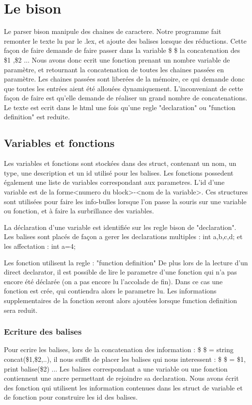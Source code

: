\documentclass{report}
\begin{document}
		\section{Le bison}{
		 Le parser bison manipule des chaines de caractere. Notre programme fait remonter le texte lu par le .lex, et ajoute des balises lorsque des réductions. Cette façon de faire demande de 
		 faire passer dans la variable \$ \$ la concatenation des \$1 ,\$2 ... Nous avons donc ecrit une fonction prenant un nombre variable de paramètre, et retournant la concatenation de toutes
		 les chaines passées en paramètre. Les chaines passées sont liberées de la mémoire, ce qui demande donc que toutes les entrées aient été allouées dynamiquement.
		 L'inconveniant de cette façon de faire est qu'elle demande de réaliser un grand nombre de concatenations.
		 Le texte est ecrit dans le html une fois qu'une regle "declaration" ou "function definition" est reduite.
			\subsection{Variables et fonctions}{
			Les variables et fonctions sont stockées dans des struct, contenant un nom, un type, une description et un id utilisé pour les balises. Les fonctions possedent également une liste 
			de variables correspondant aux parametres. L'id d'une variable est de la forme<numero du block>-<nom de la variable>.
			Ces structures sont utilisées pour faire les info-bulles lorsque l'on passe la souris sur une variable ou fonction, et à faire la surbrillance des variables.
			
			La déclaration d'une variable est identifiée sur les regle bison de "declaration". Les balises sont placés de façon a gerer les declarations multiples : int a,b,c,d;
			et les affectation : int a=4;
			
			Les fonction utilisent la regle : "function definition"
			De plus lors de la lecture d'un direct declarator, il est possible de lire le parametre d'une fonction qui n'a pas encore été déclarée (on a pas encore lu l'accolade de fin). Dans ce cas
			une fonction est crée, qui contiendra alors le parametre lu. Les informations supplementaires de la fonction seront alors ajoutées lorsque function definition sera reduit.
			\subsubsection{Ecriture des balises}{
			Pour ecrire les balises, lors de la concatenation des information : \$ \$ = string concat(\$1,\$2,..), 
			il nous suffit de placer les balises qui nous interessent : \$ \$ = \$1, print balise(\$2) ...
			Les balises correspondant a une variable ou une fonction contiennent une ancre permettant de rejoindre sa declaration. Nous avons écrit des fonction qui utilisent les information
			contenues dans les struct de variable et de fonction pour construire les id des balises. 	
		}
}}
\end{document}
